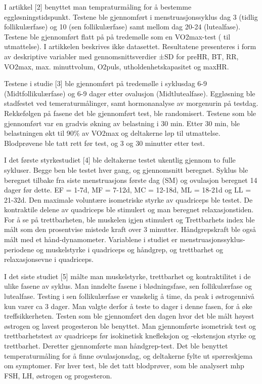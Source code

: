 \documentclass[
  letterpaper,
  DIV=11,
  numbers=noendperiod]{scrreprt}
\begin{document}
I artikkel {[}2{]} benyttet man tempraturmåling for å bestemme
eggløsningstidspunkt. Testene ble gjennomført i menstruasjonssyklus dag
3 (tidlig follikulærfase) og 10 (sen follikulærfase) samt mellom dag
20-24 (lutealfase). Testene ble gjennomført flatt på på tredemølle som
en VO2max-test ( til utmattelse). I artikkelen beskrives ikke
datasettet. Resultatene presenteres i form av deskriptive variabler med
gennomsnittsverdier ±SD for preHR, BT, RR, VO2max, max. minuttvolum,
O2puls, utholdenhetskapasitet og maxHR.

Testene i studie {[}3{]} ble gjennomført på tredemølle i syklusdag 6-9
(Midtfollikulærfase) og 6-9 dager etter ovalusjon (Midtlutealfase).
Eggløsning ble stadfestet ved temeraturmålinger, samt hormonanalyse av
morgenurin på testdag. Rekkefølgen på fasene det ble gjennomført test,
ble randomisert. Testene som ble gjennomført var en gradvis økning av
belastning i 30 min. Etter 30 min, ble belastningen økt til 90\% av
VO2max og deltakerne løp til utmattelse. Blodprøvene ble tatt rett før
test, og 3 og 30 minutter etter test.

I det første styrkestudiet {[}4{]} ble deltakerne testet ukentlig
gjennom to fulle sykluser. Begge ben ble testet hver gang, og
gjennomsnitt beregnet. Syklus ble beregnet tilbake fra siste
menstruasjons første dag (SM) og ovulasjon beregnet 14 dager før dette.
EF = 1-7d, MF = 7-12d, MC = 12-18d, ML = 18-21d og LL = 21-32d. Den
maximale voluntære isometriske styrke av quadriceps ble testet. De
kontraktile delene av quadriceps ble stimulert og man beregnet
relaxasjonstiden. For å se på trettbarheten, ble muskelen igjen
stimulert og Trettbarhets index ble målt som den prosentvise mistede
kraft over 3 minutter. Håndgrepskraft ble også målt med et
hånd-dynamometer. Variablene i studiet er menstruasjonssyklus-periodene
og muskelstyrke i quadriceps og håndgrep, og trettbarhet og
relaxasjonsevne i quadriceps.

I det siste studiet {[}5{]} målte man muskelstyrke, trettbarhet og
kontraktilitet i de ulike fasene av syklus. Man inndelte fasene i
blødningsfase, sen follikulærfase og lutealfase. Testing i sen
follikulærfase er vanskelig å time, da peak i østrogennivå kun varer ca
3 dager. Man valgte derfor å teste to dager i denne fasen, for å øke
treffsikkerheten. Testen som ble gjennomført den dagen hvor det ble målt
høyest østrogen og lavest progesteron ble benyttet. Man gjennomførte
isometrisk test og trettbarhetstest av quadriceps før isokinetisk
knefleksjon og -ekstensjon styrke og trettbarhet. Deretter gjennomførte
man håndgrep-test. Det ble benyttet temperaturmåling for å finne
ovulasjonsdag, og deltakerne fylte ut spørreskjema om symptomer. Før
hver test, ble det tatt blodprøver, som ble analysert mhp FSH, LH,
østrogen og progesteron.
\end{document}
